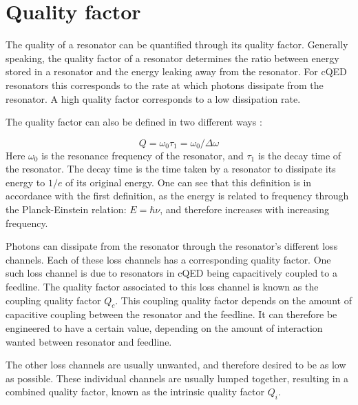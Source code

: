 \documentclass[12pt]{report}
\begin{document}
\section{Quality factor}
\label{sec:Quality factor}
The quality of a resonator can be quantified through its quality factor. Generally speaking, the quality factor of a resonator determines the ratio between energy stored in a resonator and the energy leaking away from the resonator. For cQED resonators this corresponds to the rate at which photons dissipate from the resonator. A high quality factor corresponds to a low dissipation rate.

The quality factor can also be defined in two different ways \cite[p.~23-24]{Mazin}:

\begin{equation}
    Q = \omega_0 \tau_1 = \omega_0 / \Delta \omega
    \label{eqn:quality factor definition}
\end{equation}
Here $\omega_0$ is the resonance frequency of the resonator, and $\tau_1$ is the decay time of the resonator. The decay time is the time taken by a resonator to dissipate its energy to $1/e$ of its original energy. One can see that this definition is in accordance with the first definition, as the energy is related to frequency through the Planck-Einstein relation: $E = \hbar \nu$, and therefore increases with increasing frequency.


Photons can dissipate from the resonator through the resonator's different loss channels. Each of these loss channels has a corresponding quality factor. One such loss channel is due to resonators in cQED being capacitively coupled to a feedline. The quality factor associated to this loss channel is known as the coupling quality factor $Q_c$. This coupling quality factor depends on the amount of capacitive coupling between the resonator and the feedline. It can therefore be engineered to have a certain value, depending on the amount of interaction wanted between resonator and feedline.

The other loss channels are usually unwanted, and therefore desired to be as low as possible. These individual channels are usually lumped together, resulting in a combined quality factor, known as the intrinsic quality factor $Q_i$.
\end{document}
